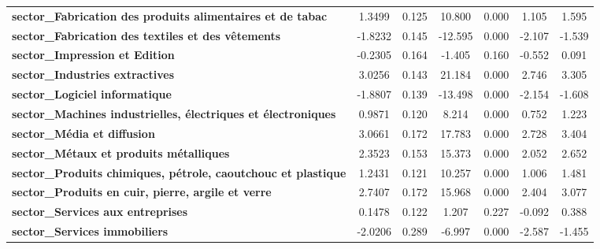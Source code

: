 \begin{center}
\begin{tabular}{lcccccc}
\textbf{sector\_Fabrication des produits alimentaires et de tabac}    &       1.3499  &        0.125     &    10.800  &         0.000        &        1.105    &        1.595     \\
\textbf{sector\_Fabrication des textiles et des vêtements}            &      -1.8232  &        0.145     &   -12.595  &         0.000        &       -2.107    &       -1.539     \\
\textbf{sector\_Impression et Edition}                                &      -0.2305  &        0.164     &    -1.405  &         0.160        &       -0.552    &        0.091     \\
\textbf{sector\_Industries extractives}                               &       3.0256  &        0.143     &    21.184  &         0.000        &        2.746    &        3.305     \\
\textbf{sector\_Logiciel informatique}                                &      -1.8807  &        0.139     &   -13.498  &         0.000        &       -2.154    &       -1.608     \\
\textbf{sector\_Machines industrielles, électriques et électroniques} &       0.9871  &        0.120     &     8.214  &         0.000        &        0.752    &        1.223     \\
\textbf{sector\_Média et diffusion}                                   &       3.0661  &        0.172     &    17.783  &         0.000        &        2.728    &        3.404     \\
\textbf{sector\_Métaux et produits métalliques}                       &       2.3523  &        0.153     &    15.373  &         0.000        &        2.052    &        2.652     \\
\textbf{sector\_Produits chimiques, pétrole, caoutchouc et plastique} &       1.2431  &        0.121     &    10.257  &         0.000        &        1.006    &        1.481     \\
\textbf{sector\_Produits en cuir, pierre, argile et verre}            &       2.7407  &        0.172     &    15.968  &         0.000        &        2.404    &        3.077     \\
\textbf{sector\_Services aux entreprises}                             &       0.1478  &        0.122     &     1.207  &         0.227        &       -0.092    &        0.388     \\
\textbf{sector\_Services immobiliers}                                 &      -2.0206  &        0.289     &    -6.997  &         0.000        &       -2.587    &       -1.455     \\

\end{tabular}
\end{center}
